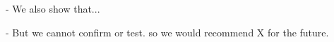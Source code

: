 \documentclass[draft]{agujournal2019}
\begin{document}
- We also show that...

- But we cannot confirm or test. so we would recommend X for the future.










%
%

%
%
%
%
%
%
%
%
\end{document}
